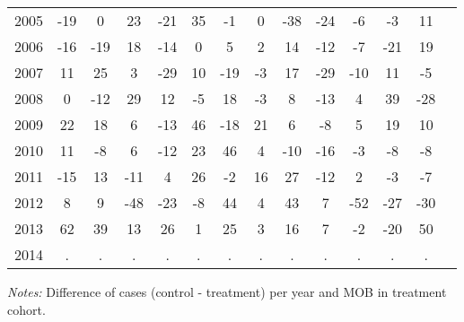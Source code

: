 \begin{table}[H]
\begin{threeparttable}
{\begin{tabular}{l*{13}{c}}
2005        &         -19&           0&          23&         -21&          35&          -1&           0&         -38&         -24&          -6&          -3&          11\\
2006        &         -16&         -19&          18&         -14&           0&           5&           2&          14&         -12&          -7&         -21&          19\\
2007        &          11&          25&           3&         -29&          10&         -19&          -3&          17&         -29&         -10&          11&          -5\\
2008        &           0&         -12&          29&          12&          -5&          18&          -3&           8&         -13&           4&          39&         -28\\
2009        &          22&          18&           6&         -13&          46&         -18&          21&           6&          -8&           5&          19&          10\\
2010        &          11&          -8&           6&         -12&          23&          46&           4&         -10&         -16&          -3&          -8&          -8\\
2011        &         -15&          13&         -11&           4&          26&          -2&          16&          27&         -12&           2&          -3&          -7\\
2012        &           8&           9&         -48&         -23&          -8&          44&           4&          43&           7&         -52&         -27&         -30\\
2013        &          62&          39&          13&          26&           1&          25&           3&          16&           7&          -2&         -20&          50\\
2014        &           .&           .&           .&           .&           .&           .&           .&           .&           .&           .&           .&           .\\
 \bottomrule \end{tabular} } \begin{tablenotes} \item \scriptsize \emph{Notes:} Difference of cases (control - treatment) per year and MOB in treatment cohort. \end{tablenotes} \end{threeparttable} \end{table} 
